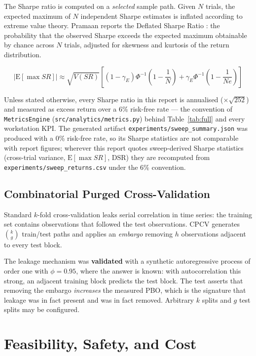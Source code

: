 \documentclass[12pt,a4paper,oneside]{report}
\begin{document}
The Sharpe ratio is computed on a \emph{selected} sample path. Given $N$ trials,
the expected maximum of $N$ independent Sharpe estimates is inflated according to
extreme value theory. Pramaan reports the Deflated Sharpe Ratio
\cite{bailey2014}: the probability
that the observed Sharpe exceeds the expected maximum obtainable by chance across
$N$ trials, adjusted for skewness and kurtosis of the return distribution.

\begin{equation}
|\text{E}[\max SR]| \approx \sqrt{V(SR)}\left[(1-\gamma_E)\Phi^{-1}\!\!\left(1-\frac{1}{N}\right) + \gamma_E\Phi^{-1}\!\!\left(1-\frac{1}{Ne}\right)\right]
\end{equation}

Unless stated otherwise, every Sharpe ratio in this report is annualised
($\times\sqrt{252}$) and measured as excess return over a 6\% risk-free rate ---
the convention of \texttt{MetricsEngine} (\texttt{src/analytics/metrics.py})
behind Table~\ref{tab:full} and every workstation KPI. The generated artifact
\texttt{experiments/sweep\_summary.json} was produced with a 0\% risk-free
rate, so its Sharpe statistics are not comparable with report figures; wherever
this report quotes sweep-derived Sharpe statistics (cross-trial variance,
$\text{E}[\max SR]$, DSR) they are recomputed from
\texttt{experiments/sweep\_returns.csv} under the 6\% convention.

\subsection{Combinatorial Purged Cross-Validation}

Standard $k$-fold cross-validation leaks serial correlation in time series: the
training set contains observations that followed the test observations. CPCV
\cite{lopez,bailey2016} generates $\binom{k}{g}$ train/test paths and applies an
\emph{embargo} removing
$h$ observations adjacent to every test block.

The leakage mechanism was \textbf{validated} with a synthetic
autoregressive process of order one with $\phi = 0.95$, where the answer is
known: with autocorrelation this strong, an adjacent training block predicts the
test block. The test asserts that removing the embargo \emph{increases} the
measured PBO, which is the signature that leakage was in fact present and was in
fact removed. Arbitrary $k$ splits and $g$ test splits may be configured.

\section{Feasibility, Safety, and Cost}
\end{document}
